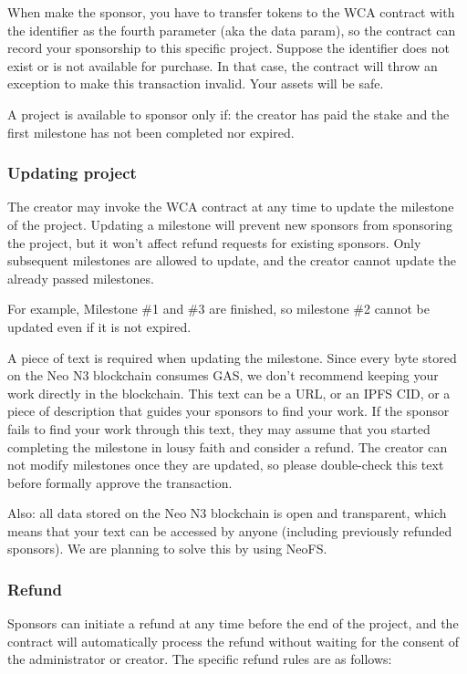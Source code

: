 \documentclass[12pt,a4paper]{article}
\begin{document}
    When make the sponsor, you have to transfer tokens to the WCA contract with
    the identifier as the fourth parameter (aka the data param), so the contract
    can record your sponsorship to this specific project.
    Suppose the identifier does not exist or is not available for purchase.
    In that case, the contract will throw an exception to make this transaction
    invalid.
    Your assets will be safe.

    A project is available to sponsor only if: the creator has paid the stake
    and the first milestone has not been completed nor expired.

    \subsubsection{Updating project}

    The creator may invoke the WCA contract at any time to update the milestone
    of the project.
    Updating a milestone will prevent new sponsors from sponsoring the project,
    but it won't affect refund requests for existing sponsors.
    Only subsequent milestones are allowed to update, and the creator cannot
    update the already passed milestones.

    For example, Milestone \#1 and \#3 are finished, so milestone \#2 cannot be
    updated even if it is not expired.

    A piece of text is required when updating the milestone.
    Since every byte stored on the Neo N3 blockchain consumes GAS, we don't
    recommend keeping your work directly in the blockchain.
    This text can be a URL, or an IPFS CID, or a piece of description that guides
    your sponsors to find your work.
    If the sponsor fails to find your work through this text, they may assume that
    you started completing the milestone in lousy faith and consider a refund.
    The creator can not modify milestones once they are updated, so please
    double-check this text before formally approve the transaction.

    Also: all data stored on the Neo N3 blockchain is open and transparent, which
    means that your text can be accessed by anyone (including previously refunded
    sponsors). We are planning to solve this by using NeoFS.

    \subsubsection{Refund}

    Sponsors can initiate a refund at any time before the end of the project,
    and the contract will automatically process the refund without waiting for
    the consent of the administrator or creator.
    The specific refund rules are as follows:
\end{document}
